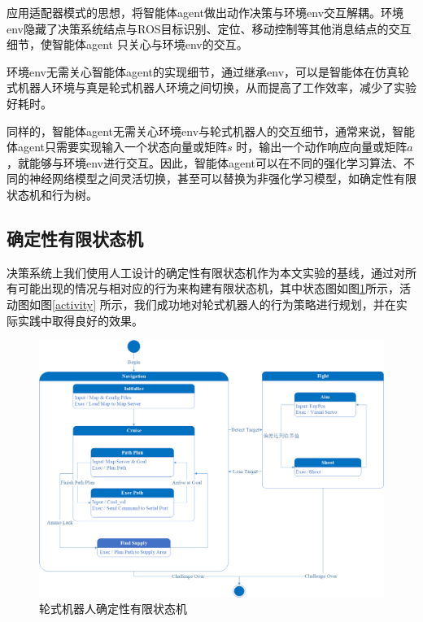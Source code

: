 应用适配器模式的思想，将智能体agent做出动作决策与环境env交互解耦。环境env隐藏了决策系统结点与ROS目标识别、定位、移动控制等其他消息结点的交互细节，使智能体agent 只关心与环境env的交互。

环境env无需关心智能体agent的实现细节，通过继承env，可以是智能体在仿真轮式机器人环境与真是轮式机器人环境之间切换，从而提高了工作效率，减少了实验好耗时。

同样的，智能体agent无需关心环境env与轮式机器人的交互细节，通常来说，智能体agent只需要实现输入一个状态向量或矩阵$s$ 时，输出一个动作响应向量或矩阵$a$，就能够与环境env进行交互。因此，智能体agent可以在不同的强化学习算法、不同的神经网络模型之间灵活切换，甚至可以替换为非强化学习模型，如确定性有限状态机和行为树。

\subsection{确定性有限状态机}\label{dfa}
决策系统上我们使用人工设计的确定性有限状态机作为本文实验的基线，通过对所有可能出现的情况与相对应的行为来构建有限状态机，其中状态图如图\ref{state}所示，活动图如图\ref{activity} 所示，我们成功地对轮式机器人的行为策略进行规划，并在实际实践中取得良好的效果。

\begin{figure}[h]
  \centering
  \includegraphics[width=\textwidth]{figures/state.png}
  \caption{轮式机器人确定性有限状态机}\label{state}
\end{figure}

